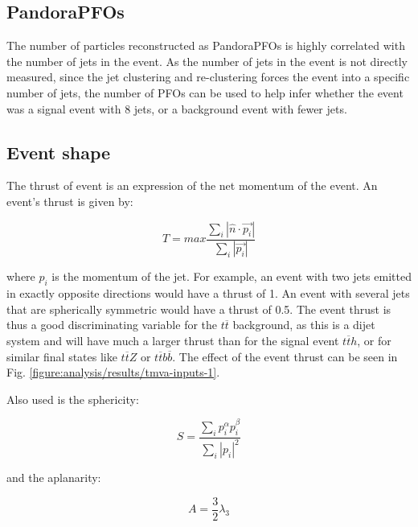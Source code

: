 \subsection{PandoraPFOs}
\label{section:pfos}
The number of particles reconstructed as Pandora\acrshort{PFO}s is highly correlated with the number of jets in the event. As the number of jets in the event is not directly measured, since the jet clustering and re-clustering forces the event into a specific number of jets, the number of \acrshort{PFO}s can be used to help infer whether the event was a signal event with 8 jets, or a background event with fewer jets.

\subsection{Event shape}
\label{section:event-shape}
The thrust of event is an expression of the net momentum of the event. An event's thrust is given by:

\begin{equation}
	T = max \frac{\sum_i | \hat{n} \cdot \overrightarrow{p_i} |}{\sum_i | \overrightarrow{p_i} |}
\label{eq:thrust}
\end{equation}

where $p_i$ is the momentum of the jet. For example, an event with two jets emitted in exactly opposite directions would have a thrust of 1. An event with several jets that are spherically symmetric would have a thrust of 0.5. The event thrust is thus a good discriminating variable for the $t\overline{t}$ background, as this is a dijet system and will have much a larger thrust than for the signal event $t\overline{t}h$, or for similar final states like $t\overline{t}Z$ or $t\overline{t}b\overline{b}$. The effect of the event thrust can be seen in Fig. \ref{figure:analysis/results/tmva-inputs-1}.

Also used is the sphericity:

\begin{equation}
	S = \frac{\sum_i p_i^{\alpha} p_i^{\beta}}{\sum_i | p_i |^2}
\label{eq:sphericity}
\end{equation}

and the aplanarity:

\begin{equation}
	A = \frac{3}{2}\lambda_3
\label{eq:aplanarity}
\end{equation}

